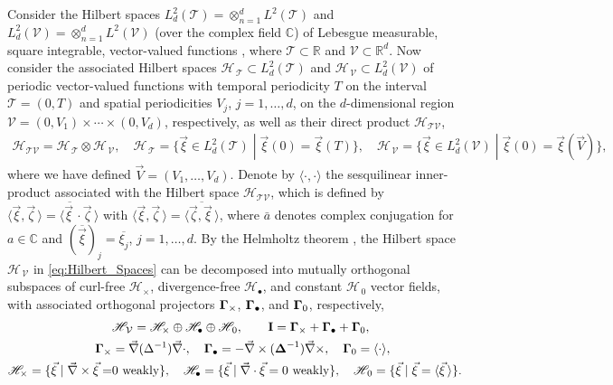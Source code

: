 \documentclass[11pt]{amsart}
\newcommand{\Ib}{\mathbf{I}}
\newcommand{\Tc}{\mathcal{T}}
\newcommand{\Vc}{\mathcal{V}}
\newcommand{\Hs}{\mathscr{H}}
\newcommand\bDelta{\mbox{\boldmath${\Delta}$}}
\newcommand\bGamma{\mbox{\boldmath${\Gamma}$}}
\begin{document}
Consider the Hilbert spaces $L^2_d(\Tc)=\otimes_{n=1}^dL^2(\Tc)$ and
$L^2_d(\Vc)=\otimes_{n=1}^dL^2(\Vc)$ (over the complex field $\mathbb{C}$)
of Lebesgue measurable, square integrable, vector-valued functions
\cite{Folland:99}, where $\Tc\subset\mathbb{R}$ and $\Vc\subset\mathbb{R}^d$. Now 
consider the associated Hilbert spaces $\Hs_{\,\Tc}\subset L^2_d(\Tc)$ and
$\Hs_{\,\Vc}\subset L^2_d(\Vc)$ of periodic vector-valued functions with
temporal periodicity $T$ on the interval $\Tc=(0,T)$ and spatial
periodicities $V_j$, $j=1,\ldots,d$, on the $d$-dimensional region
$\Vc=(0,V_1)\times\cdots\times(0,V_d)$, respectively, as well as their direct product 
$\Hs_{\Tc\Vc}$,
%
\begin{align}\label{eq:Hilbert_Spaces}
  \Hs_{\Tc\Vc}=\Hs_{\,\Tc}\otimes\Hs_{\,\Vc}, \quad
  \Hs_{\,\Tc}=\{ 
     \vec{\xi}\in L^2_d(\Tc)\;|\;
     \vec{\xi}(0)=\vec{\xi}(T) 
                        \}, \quad
  \Hs_{\,\Vc}=\{ 
     \vec{\xi}\in L^2_d(\Vc)\;|\;
     \vec{\xi}(0)=\vec{\xi}(\vec{V}) 
                        \}, 
\end{align}
%
where we have defined $\vec{V}=(V_1,\ldots,V_d)$. Denote by $\langle\cdot,\cdot\rangle$ the
sesquilinear inner-product associated with the Hilbert space
$\Hs_{\Tc\Vc}$, which is defined by
$\langle\vec{\xi},\vec{\zeta}\,\rangle=\langle\overline{\vec{\xi}\,}\cdot\vec{\zeta}\,\rangle$  with 
$\langle\vec{\xi},\vec{\zeta}\,\rangle=\overline{\langle\vec{\zeta},\vec{\xi}\,\rangle}$, where $\bar{a}$ 
denotes complex conjugation for $a\in\mathbb{C}$ and
$(\overline{\vec{\xi}})_j=\overline{\xi_j}$, $j=1,\ldots,d$. By the Helmholtz
theorem \cite{Denaro:2003:0271,Bhatia:IEE:1077}, the Hilbert space
$\Hs_{\,\Vc}$ in \eqref{eq:Hilbert_Spaces} can be decomposed into
mutually orthogonal subspaces of curl-free $\Hs_\times$, divergence-free
$\Hs_\bullet$, and constant $\Hs_{\,0}$ vector fields, with associated
orthogonal projectors $\bGamma_\times$, $\bGamma_\bullet$, and $\bGamma_0$,
respectively, 
\cite{Fannjiang:SIAM_JAM:333,MILTON:2002:TC}    
%
\begin{align}\label{eq:Helmholtz}
  &\Hs_{\,\Vc}=\Hs_\times\oplus\Hs_\bullet\oplus\Hs_{\,0},\qquad
  \Ib=\bGamma_\times+\bGamma_\bullet+\bGamma_0, \\
  \bGamma_\times&=\vec{\nabla}(\Delta^{-1})\vec{\nabla}\cdot, \quad
  \bGamma_\bullet=-\vec{\nabla}\times(\bDelta^{-1})\vec{\nabla}\times, \quad
  \bGamma_0=\langle\cdot\rangle, \quad
  \notag \\
  \Hs_\times=\{\vec{\xi}\;|\;\vec{\nabla}\times\vec{\xi}=&0 \text{ weakly}\}, \quad
  \Hs_\bullet
      =\{\vec{\xi}\;|\;\vec{\nabla}\cdot\vec{\xi}=0 \text{ weakly}\},   \quad
  \Hs_{\,0}
      =\{\vec{\xi}\;|\;\vec{\xi}=\langle\vec{\xi}\,\rangle\}.
     \notag  
\end{align}
%
\end{document}
